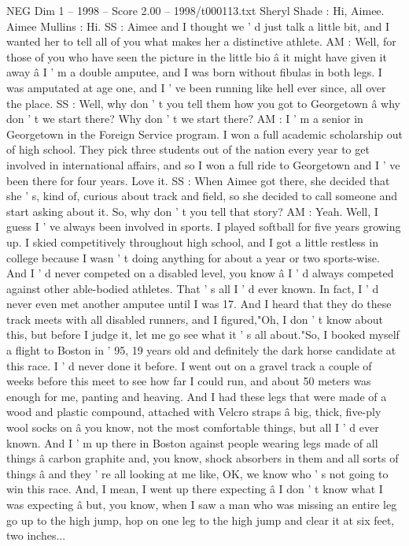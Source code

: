 \begin{textsample}{NEG Dim 1 – 1998 – Score 2.00 – 1998/t000113.txt}  \label{ex:f1_neg_066}
Sheryl Shade : Hi, Aimee.
Aimee Mullins : Hi.
SS : Aimee and I thought we ' d just talk a little bit, and I wanted her to tell all of you what makes her a distinctive athlete.
AM : Well, for those of you who have seen the picture in the little bio â it might have given it away â I ' m a double amputee, and I was born without fibulas in both legs.
I was amputated at age one, and I ' ve been running like hell ever since, all over the place.
SS : Well, why don ' t you tell them how you got to Georgetown â why don ' t we start there?
Why don ' t we start there?
AM : I ' m a senior in Georgetown in the Foreign Service program.
I won a full academic scholarship out of high school.
They pick three students out of the nation every year to get involved in international affairs, and so I won a full ride to Georgetown and I ' ve been there for four years.
Love it.
SS : When Aimee got there, she decided that she ' s, kind of, curious about track and field, so she decided to call someone and start asking about it.
So, why don ' t you tell that story?
AM : Yeah.
Well, I guess I ' ve always been involved in sports.
I played softball for five years growing up.
I skied competitively throughout high school, and I got a little restless in college because I wasn ' t doing anything for about a year or two sports-wise.
And I ' d never competed on a disabled level, you know â I ' d always competed against other able-bodied athletes.
That ' s all I ' d ever known.
In fact, I ' d never even met another amputee until I was 17.
And I heard that they do these track meets with all disabled runners, and I figured,"Oh, I don ' t know about this, but before I judge it, let me go see what it ' s all about."So, I booked myself a flight to Boston in ' 95, 19 years old and definitely the dark horse candidate at this race.
I ' d never done it before.
I went out on a gravel track a couple of weeks before this meet to see how far I could run, and about 50 meters was enough for me, panting and heaving.
And I had these legs that were made of a wood and plastic compound, attached with Velcro straps â big, thick, five-ply wool socks on â you know, not the most comfortable things, but all I ' d ever known.
And I ' m up there in Boston against people wearing legs made of all things â carbon graphite and, you know, shock absorbers in them and all sorts of things â and they ' re all looking at me like, OK, we know who ' s not going to win this race.
And, I mean, I went up there expecting â I don ' t know what I was expecting â but, you know, when I saw a man who was missing an entire leg go up to the high jump, hop on one leg to the high jump and clear it at six feet, two inches...

\end{textsample}

